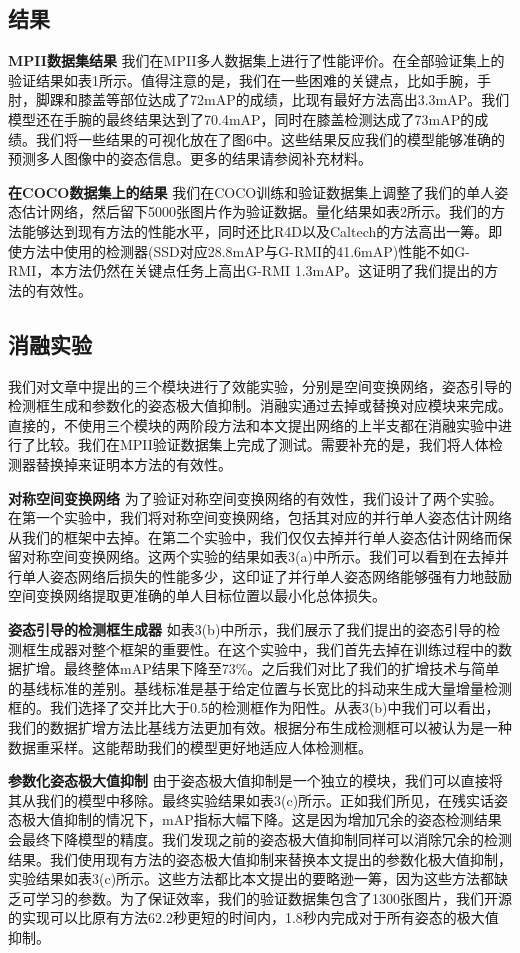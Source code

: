 \subsection{结果}
\textbf{MPII数据集结果} 我们在MPII多人数据集上进行了性能评价。在全部验证集上的验证结果如表1所示。值得注意的是，我们在一些困难的关键点，比如手腕，手肘，脚踝和膝盖等部位达成了72mAP的成绩，比现有最好方法高出3.3mAP。我们模型还在手腕的最终结果达到了70.4mAP，同时在膝盖检测达成了73mAP的成绩。我们将一些结果的可视化放在了图6中。这些结果反应我们的模型能够准确的预测多人图像中的姿态信息。更多的结果请参阅补充材料。

\textbf{在COCO数据集上的结果} 我们在COCO训练和验证数据集上调整了我们的单人姿态估计网络，然后留下5000张图片作为验证数据。量化结果如表2所示。我们的方法能够达到现有方法的性能水平，同时还比R4D以及Caltech的方法高出一筹。即使方法中使用的检测器(SSD对应28.8mAP与G-RMI的41.6mAP)性能不如G-RMI，本方法仍然在关键点任务上高出G-RMI 1.3mAP。这证明了我们提出的方法的有效性。

\subsection{消融实验}
我们对文章中提出的三个模块进行了效能实验，分别是空间变换网络，姿态引导的检测框生成和参数化的姿态极大值抑制。消融实通过去掉或替换对应模块来完成。直接的，不使用三个模块的两阶段方法和本文提出网络的上半支都在消融实验中进行了比较。我们在MPII验证数据集上完成了测试。需要补充的是，我们将人体检测器替换掉来证明本方法的有效性。

\textbf{对称空间变换网络} 为了验证对称空间变换网络的有效性，我们设计了两个实验。在第一个实验中，我们将对称空间变换网络，包括其对应的并行单人姿态估计网络从我们的框架中去掉。在第二个实验中，我们仅仅去掉并行单人姿态估计网络而保留对称空间变换网络。这两个实验的结果如表3(a)中所示。我们可以看到在去掉并行单人姿态网络后损失的性能多少，这印证了并行单人姿态网络能够强有力地鼓励空间变换网络提取更准确的单人目标位置以最小化总体损失。

\textbf{姿态引导的检测框生成器} 如表3(b)中所示，我们展示了我们提出的姿态引导的检测框生成器对整个框架的重要性。在这个实验中，我们首先去掉在训练过程中的数据扩增。最终整体mAP结果下降至73\%。之后我们对比了我们的扩增技术与简单的基线标准的差别。基线标准是基于给定位置与长宽比的抖动来生成大量增量检测框的。我们选择了交并比大于0.5的检测框作为阳性。从表3(b)中我们可以看出，我们的数据扩增方法比基线方法更加有效。根据分布生成检测框可以被认为是一种数据重采样。这能帮助我们的模型更好地适应人体检测框。

\textbf{参数化姿态极大值抑制} 由于姿态极大值抑制是一个独立的模块，我们可以直接将其从我们的模型中移除。最终实验结果如表3(c)所示。正如我们所见，在残实话姿态极大值抑制的情况下，mAP指标大幅下降。这是因为增加冗余的姿态检测结果会最终下降模型的精度。我们发现之前的姿态极大值抑制同样可以消除冗余的检测结果。我们使用现有方法的姿态极大值抑制来替换本文提出的参数化极大值抑制，实验结果如表3(c)所示。这些方法都比本文提出的要略逊一筹，因为这些方法都缺乏可学习的参数。为了保证效率，我们的验证数据集包含了1300张图片，我们开源的实现可以比原有方法62.2秒更短的时间内，1.8秒内完成对于所有姿态的极大值抑制。

